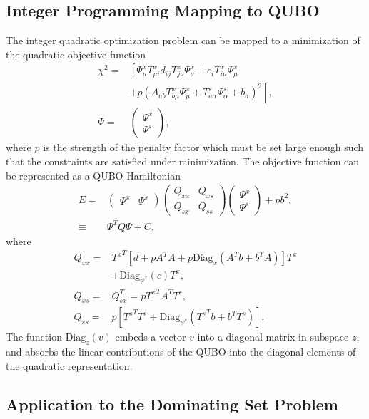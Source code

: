 \documentclass[prd,twocolumn,tightenlines,preprintnumbers,showpacs,superscriptaddress,notitlepage,nofootinbib,eqsecnum,floatfix,longbibliography]{revtex4}
\begin{document}
\subsection{Integer Programming Mapping to QUBO}
\label{sec:results:ilp}
The integer quadratic optimization problem can be mapped to a minimization of the quadratic objective function
\begin{align}
\chi^2 = & \left[\Psi^x_{\mu} T^x_{\mu i}d_{ij} T^x_{j \nu}\Psi^x_\nu + c_i T^x_{i\mu} \Psi^x_\mu \right. \nonumber\\
&\left.+ p (A_{a b} T^x_{b \mu} \Psi^x_{\mu} + T^s_{a \alpha} \Psi^s_\alpha + b_a)^2 \right],\\
\Psi = & \begin{pmatrix}
\Psi^x\\
\Psi^s
\end{pmatrix},
\end{align}
where $p$ is the strength of the penalty factor which must be set large enough such that the constraints are satisfied under minimization. The objective function can be represented as a QUBO Hamiltonian
\begin{align}
E = &
\begin{pmatrix}
\Psi^x & \Psi^s
\end{pmatrix}
\begin{pmatrix}
Q_{xx} & Q_{xs}\\
Q_{sx} & Q_{ss} 
\end{pmatrix}
\begin{pmatrix}
\Psi^x\\ \Psi^s
\end{pmatrix} + pb^2,\\
\equiv & \Psi^T Q \Psi + C,
\label{eq:matrix_form}
\end{align}
where
\begin{align}
Q_{xx} = & {T^{x}}^T \left[ d + p A^T A + p \mathrm{Diag}_{x} \left(A^T b + b^T A\right) \right] T^x \nonumber \\
&+ \mathrm{Diag}_{\psi^x}(c) T^x,\\
Q_{xs} = & Q_{sx}^T = p {T^{x}}^T A^T T^s,\\
Q_{ss} = & p\left[ {T^{s}}^T T^s + \mathrm{Diag}_{\psi^s}\left( {T^{s}}^T b + b^T T^s\right) \right].
\end{align}
The function $\mathrm{Diag}_{z}(v)$ embeds a vector $v$ into a diagonal matrix in subspace $z$, and absorbs the linear contributions of the QUBO into the diagonal elements of the quadratic representation.

\subsection{Application to the Dominating Set Problem}
\label{sec:results:mds}
\end{document}
